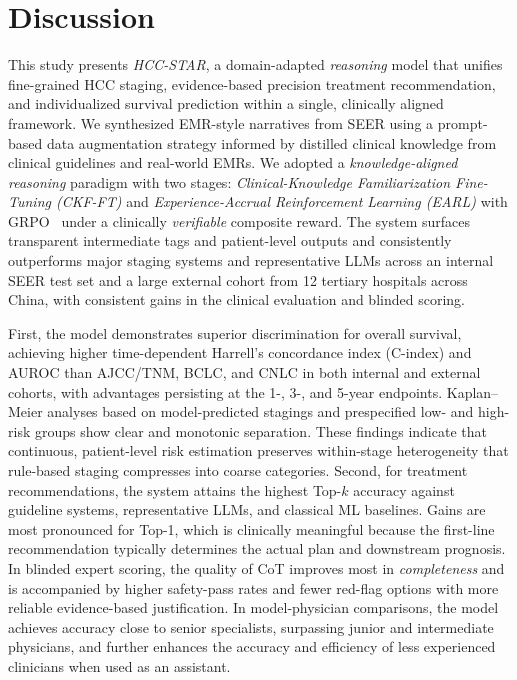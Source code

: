 \documentclass{article}
\begin{document}
\section{Discussion}\label{sec3}
This study presents \textit{HCC-STAR}, a domain-adapted \emph{reasoning} model that unifies fine-grained HCC staging, evidence-based precision treatment recommendation, and individualized survival prediction within a single, clinically aligned framework. We synthesized EMR-style narratives from SEER using a prompt-based data augmentation strategy informed by distilled clinical knowledge from clinical guidelines and real-world EMRs. We adopted a \emph{knowledge-aligned reasoning} paradigm with two stages: \emph{Clinical-Knowledge Familiarization Fine-Tuning (CKF-FT)} and \emph{Experience-Accrual Reinforcement Learning (EARL)} with GRPO~\cite{shao_deepseekmath_2024} under a clinically \emph{verifiable} composite reward. The system surfaces transparent intermediate tags and patient-level outputs and consistently outperforms major staging systems and representative LLMs across an internal SEER test set and a large external cohort from 12 tertiary hospitals across China, with consistent gains in the clinical evaluation and blinded scoring.

First, the model demonstrates superior discrimination for overall survival, achieving higher time-dependent Harrell’s concordance index (C-index) and AUROC than AJCC/TNM, BCLC, and CNLC in both internal and external cohorts, with advantages persisting at the 1-, 3-, and 5-year endpoints. Kaplan–Meier analyses based on model-predicted stagings and prespecified low- and high-risk groups show clear and monotonic separation. These findings indicate that continuous, patient-level risk estimation preserves within-stage heterogeneity that rule-based staging compresses into coarse categories.
Second, for treatment recommendations, the system attains the highest Top-$k$ accuracy against guideline systems, representative LLMs, and classical ML baselines. Gains are most pronounced for Top-1, which is clinically meaningful because the first-line recommendation typically determines the actual plan and downstream prognosis. In blinded expert scoring, the quality of CoT improves most in \emph{completeness} and is accompanied by higher safety-pass rates and fewer red-flag options with more reliable evidence-based justification. In model-physician comparisons, the model achieves accuracy close to senior specialists, surpassing junior and intermediate physicians, and further enhances the accuracy and efficiency of less experienced clinicians when used as an assistant.
\end{document}
